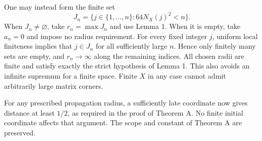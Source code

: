\documentclass[10pt]{article}
\begin{document}
One may instead form the finite set \[J_n=\{j\in\{1,\ldots,n\}:64N_X(j)^2<n\}.\] When \(J_n\ne\varnothing\), take \(r_n=\max J_n\) and use Lemma 1. When it is empty, take \(a_n=0\) and impose no radius requirement. For every fixed integer \(j\), uniform local finiteness implies that \(j\in J_n\) for all sufficiently large \(n\). Hence only finitely many sets are empty, and \(r_n\to\infty\) along the remaining indices. All chosen radii are finite and satisfy exactly the strict hypothesis of Lemma 1. This also avoids an infinite supremum for a finite space. Finite \(X\) in any case cannot admit arbitrarily large matrix corners.\par
For any prescribed propagation radius, a sufficiently late coordinate now gives distance at least \(1/2\), as required in the proof of Theorem A. No finite initial coordinate affects that argument. The scope and constant of Theorem A are preserved.\par
\end{document}
